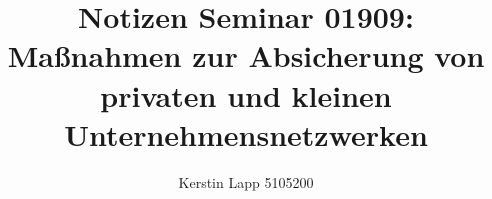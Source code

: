 \documentclass[11pt]{article}
\title{Notizen Seminar 01909: Maßnahmen zur Absicherung von privaten und kleinen Unternehmensnetzwerken }
\author{Kerstin Lapp 5105200}
\begin{document}
\maketitle
\newpage



















\nocite{*}




\newpage

\end{document}
